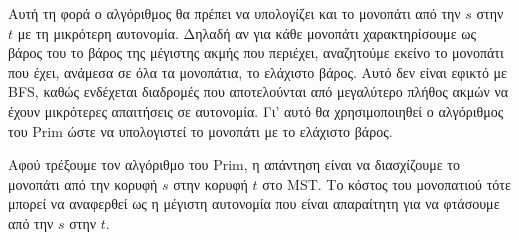 Αυτή τη φορά ο αλγόριθμος θα πρέπει να υπολογίζει και το μονοπάτι από την $s$ στην $t$ με τη μικρότερη αυτονομία. Δηλαδή αν για κάθε μονοπάτι χαρακτηρίσουμε ως βάρος του το βάρος της μέγιστης ακμής που περιέχει, αναζητούμε εκείνο το μονοπάτι που έχει, ανάμεσα σε όλα τα μονοπάτια, το ελάχιστο βάρος. Αυτό δεν είναι εφικτό με \textlatin{BFS}, καθώς ενδέχεται διαδρομές που αποτελούνται από μεγαλύτερο πλήθος ακμών να έχουν μικρότερες απαιτήσεις σε αυτονομία. Γι' αυτό θα χρησιμοποιηθεί ο αλγόριθμος του \textlatin{Prim} ώστε να υπολογιστεί το μονοπάτι με το ελάχιστο βάρος.

Αφού τρέξουμε τον αλγόριθμο του \textlatin{Prim}, η απάντηση είναι να διασχίζουμε το μονοπάτι από την κορυφή $s$ στην κορυφή $t$ στο \textlatin{MST}. Το κόστος του μονοπατιού τότε μπορεί να αναφερθεί ως η μέγιστη αυτονομία που είναι απαραίτητη για να φτάσουμε από την $s$ στην $t$.
